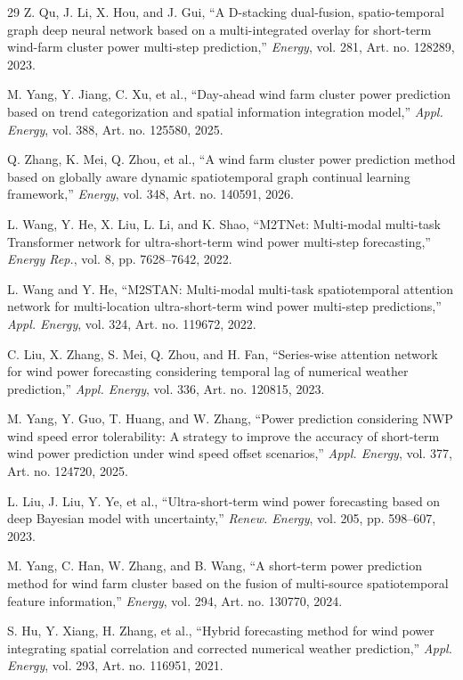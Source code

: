 \begin{thebibliography}{29}
Z. Qu, J. Li, X. Hou, and J. Gui, ``A D-stacking dual-fusion, spatio-temporal graph deep neural network based on a multi-integrated overlay for short-term wind-farm cluster power multi-step prediction,'' \textit{Energy}, vol. 281, Art. no. 128289, 2023.

M. Yang, Y. Jiang, C. Xu, et al., ``Day-ahead wind farm cluster power prediction based on trend categorization and spatial information integration model,'' \textit{Appl. Energy}, vol. 388, Art. no. 125580, 2025.

Q. Zhang, K. Mei, Q. Zhou, et al., ``A wind farm cluster power prediction method based on globally aware dynamic spatiotemporal graph continual learning framework,'' \textit{Energy}, vol. 348, Art. no. 140591, 2026.

L. Wang, Y. He, X. Liu, L. Li, and K. Shao, ``M2TNet: Multi-modal multi-task Transformer network for ultra-short-term wind power multi-step forecasting,'' \textit{Energy Rep.}, vol. 8, pp. 7628--7642, 2022.

L. Wang and Y. He, ``M2STAN: Multi-modal multi-task spatiotemporal attention network for multi-location ultra-short-term wind power multi-step predictions,'' \textit{Appl. Energy}, vol. 324, Art. no. 119672, 2022.

C. Liu, X. Zhang, S. Mei, Q. Zhou, and H. Fan, ``Series-wise attention network for wind power forecasting considering temporal lag of numerical weather prediction,'' \textit{Appl. Energy}, vol. 336, Art. no. 120815, 2023.

M. Yang, Y. Guo, T. Huang, and W. Zhang, ``Power prediction considering NWP wind speed error tolerability: A strategy to improve the accuracy of short-term wind power prediction under wind speed offset scenarios,'' \textit{Appl. Energy}, vol. 377, Art. no. 124720, 2025.

L. Liu, J. Liu, Y. Ye, et al., ``Ultra-short-term wind power forecasting based on deep Bayesian model with uncertainty,'' \textit{Renew. Energy}, vol. 205, pp. 598--607, 2023.

M. Yang, C. Han, W. Zhang, and B. Wang, ``A short-term power prediction method for wind farm cluster based on the fusion of multi-source spatiotemporal feature information,'' \textit{Energy}, vol. 294, Art. no. 130770, 2024.

S. Hu, Y. Xiang, H. Zhang, et al., ``Hybrid forecasting method for wind power integrating spatial correlation and corrected numerical weather prediction,'' \textit{Appl. Energy}, vol. 293, Art. no. 116951, 2021.


\end{thebibliography}
